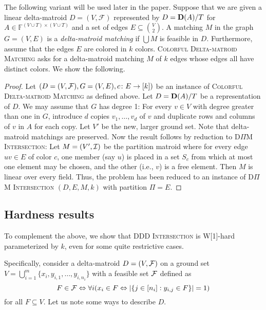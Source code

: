 The following variant will be used later in the paper.
Suppose that we are given a linear delta-matroid $D = (V, \mathcal{F})$ represented by $D = \mathbf D(A) / T$ for $A \in \mathbb{F}^{(V \cup T) \times (V \cup T)}$ and a set of edges $E \subseteq \binom{V}{2}$.
A matching $M$ in the graph $G=(V, E)$ is a \emph{delta-matroid matching} if $\bigcup M$ is feasible in $D$.
Furthermore, assume that the edges $E$ are colored in $k$ colors. 
\textsc{Colorful Delta-matroid Matching}
asks for a delta-matroid matching $M$ of $k$ edges whose edges all have distinct colors.
We show the following.

\dmmatching*

\begin{proof}
  Let $(D=(V,\mathcal F), G=(V,E), c \colon E \to [k])$ be an instance of 
  \textsc{Colorful Delta-matroid Matching} as defined above.
  Let $D=\mathbf D(A)/T$ be a representation of $D$. 
  We may assume that $G$ has degree 1: For every $v \in V$ with degree greater than one in $G$,
  introduce $d$ copies $v_1, \dots, v_d$ of $v$ and duplicate rows and columns of $v$ in $A$ for each copy.
  Let $V'$ be the new, larger ground set. Note that delta-matroid matchings are preserved.
  Now the result follows by reduction to \textsc{D$\Pi$M Intersection}:
  Let $M=(V',\mathcal I)$ be the partition matroid where for every edge $uv \in E$ of color $c$,
  one member (say $u$) is placed in a set $S_c$ from which at most one element may be chosen,
  and the other (i.e., $v$) is a free element. Then $M$ is linear over every field.
  Thus, the problem has been reduced to an instance of \textsc{D$\Pi$M Intersection}
  $(D,E,M,k)$ with partition $\Pi=E$. 
\end{proof}

\subsection{Hardness results}
\label{sec:dm-part1-hardness}

To complement the above, we show that \textsc{DDD Intersection} is
W[1]-hard parameterized by $k$, even for some quite restrictive cases. 

\dmhardness*

Specifically, consider a delta-matroid $D=(V,\mathcal F)$ on a ground set
$V=\bigcup_{i=1}^m \{x_i, y_{i,1}, \ldots, y_{i,n_i}\}$
with a feasible set $\mathcal F$ defined as
\[
  F \in \mathcal F \Leftrightarrow \forall i (x_i \in F \Leftrightarrow |\{ j \in [n_i]: y_{i,j} \in F \}| = 1)
\]
for all $F \subseteq V$. 
Let us note some ways to describe $D$.

